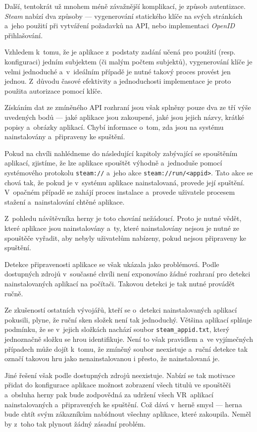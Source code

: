Další, tentokrát už mnohem méně závažnější komplikací, je způsob
autentizace. \emph{Steam} nabízí dva způsoby
--- vygenerování statického klíče na svých stránkách a~jeho použití
při vytváření požadavků na API, nebo implementaci \emph{OpenID} přihlašování.

Vzhledem k~tomu, že je aplikace z~podstaty zadání učená pro použití
(resp. konfiguraci) jedním subjektem (či malým počtem subjektů),
vygenerování klíče je velmi jednoduché a~v~ideálním případě je nutné
takový proces provést jen jednou. Z~důvodu časové efektivity a 
jednoduchosti implementace je proto použita autorizace pomocí klíče.

Získáním dat ze zmíněného API rozhraní jsou však splněny pouze dva
ze tří výše uvedených bodů --- jaké aplikace jsou zakoupené, jaké jsou
jejich názvy, krátké popisy a~obrázky aplikací. Chybí informace o~tom,
zda jsou na systému nainstalovány a~připraveny ke spuštění.

Pokud na chvíli nahlédneme do následující kapitoly zabývající se
spouštěním aplikací, zjistíme, že lze aplikace spouštět výhodně a~jednoduše pomocí systémového protokolu \texttt{steam://} a~jeho akce
\texttt{steam://run/<appid>}. Tato akce se chová
tak, že pokud je v~systému aplikace nainstalovaná, provede její
spuštění. V~opačném případě se zahájí proces instalace a~provede
uživatele procesem stažení a~nainstalování chtěné aplikace. 

Z~pohledu návštěvníka herny je toto chování nežádoucí. Proto je nutné vědět, které aplikace jsou nainstalovány a~ty, které nainstalovány
nejsou je nutné ze spouštěče vyřadit, aby nebyly uživatelům nabízeny,
pokud nejsou připraveny ke spuštění.

Detekce připravenosti aplikace se však ukázala jako
problémová. Podle dostupných zdrojů v~současné chvíli není exponováno
žádné rozhraní pro detekci nainstalovaných aplikací na počítači. 
Takovou detekci je tak nutné provádět ručně. 

Ze zkušeností ostatních vývojářů, kteří se o~detekci nainstalovaných aplikací pokusili,
plyne, že ruční sken složek není tak jednoduchý. \autocite{hardgamedetection} Většina aplikací splňuje
podmínku, že se v~jejich složkách nachází soubor
\texttt{steam\_appid.txt}, který jednoznačně složku se hrou
identifikuje. Není to však pravidlem a~ve vyjímečných případech může
dojít k~tomu, že zmíněný soubor neexistuje a~ruční detekce tak 
označí takovou hru jako nenainstalovanou i přesto, že nainstalovaná je.

Jiné řešení však podle dostupných zdrojů neexistuje. Nabízí se tak
motivace přidat do konfigurace aplikace možnost zobrazení všech titulů
ve spouštěči a~obsluha herny pak bude zodpovědná za udržení všech VR~aplikací 
nainstalovaných a~připravených ke spuštění. Což dává v~herně smysl ---
herna bude chtít svým zákazníkům nabídnout všechny aplikace, které
zakoupila. Neměl by z~toho tak plynout žádný zásadní problém.

